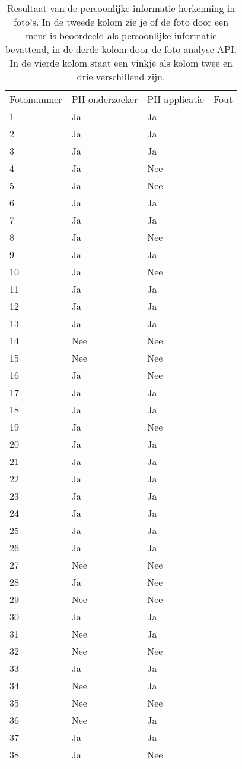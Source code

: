 \begin{table}

\begin{tabularx}{\linewidth}{ |l|l|l|X| } 
	\hline
	Fotonummer & PII-onderzoeker & PII-applicatie & Fout  \\ [0.5ex]
	
	1 & Ja & Ja & \\
	2 & Ja & Ja & \\
	3 & Ja & Ja & \\
	4& Ja & Nee & \checkmark \\
	5& Ja & Nee & \checkmark \\
	6 & Ja & Ja & \\
	7 & Ja & Ja & \\
	8 & Ja & Nee & \checkmark \\
	9 & Ja & Ja & \\
	10 & Ja & Nee & \checkmark \\
	11 & Ja & Ja & \\
	12 & Ja & Ja & \\
	13 & Ja & Ja & \\
	14 & Nee & Nee & \\
	15 & Nee & Nee & \\
	16 & Ja & Nee & \checkmark \\
	17 & Ja & Ja & \checkmark  \\
	18 & Ja & Ja & \\
	19 & Ja & Nee & \checkmark \\
	20 & Ja & Ja & \\
	21 & Ja & Ja & \\
	22 & Ja & Ja & \\
	23 & Ja & Ja & \\
	24 & Ja & Ja & \\
	25 & Ja & Ja & \\
	26 & Ja & Ja & \\
	27 & Nee & Nee & \\
	28 & Ja & Nee & \checkmark \\
	29 & Nee & Nee & \\
	30 & Ja & Ja & \\
	31 & Nee & Ja & \checkmark \\
	32 & Nee & Nee & \\
	33 & Ja & Ja & \\
	34 & Nee & Ja & \checkmark \\
	35 & Nee & Nee & \\
	36 & Nee & Ja & \checkmark \\
	37 & Ja & Ja & \\
	38 & Ja & Nee & \checkmark \\
	\hline
	
\end{tabularx}
    \caption{Resultaat van de persoonlijke-informatie-herkenning in foto's. In de tweede kolom zie je of de foto door een mens is beoordeeld als persoonlijke informatie bevattend, in de derde kolom door de foto-analyse-API. In de vierde kolom staat een vinkje als kolom twee en drie verschillend zijn.}
\end{table}


